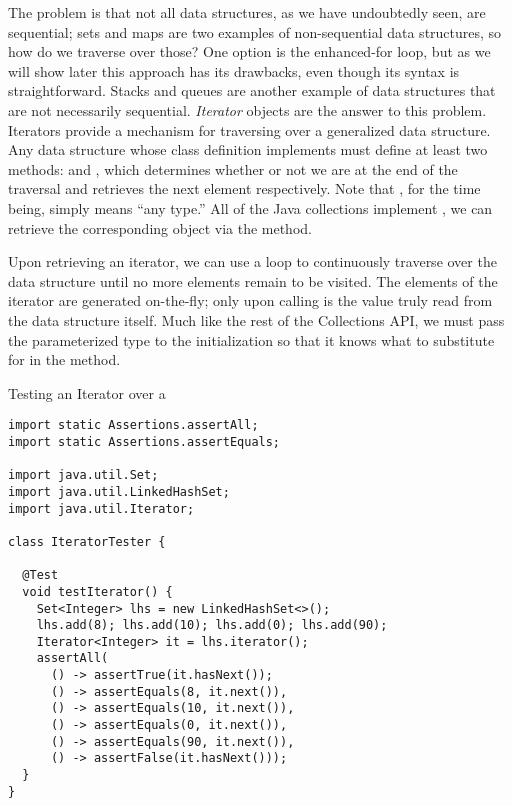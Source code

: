 The problem is that not all data structures, as we have undoubtedly seen, are sequential; sets and maps are two examples of non-sequential data structures, so how do we traverse over those? One option is the enhanced-for loop, but as we will show later this approach has its drawbacks, even though its syntax is straightforward. Stacks and queues are another example of data structures that are not necessarily sequential. \emph{Iterator} objects are the answer to this problem. Iterators provide a mechanism for traversing over a generalized data structure. Any data structure whose class definition implements  must define at least two methods:  and , which determines whether or not we are at the end of the traversal and retrieves the next element respectively. Note that , for the time being, simply means ``any type.'' All of the Java collections implement , we can retrieve the corresponding  object via the  method. 

Upon retrieving an iterator, we can use a  loop to continuously traverse over the data structure until no more elements remain to be visited. The elements of the iterator are generated on-the-fly; only upon calling  is the value truly read from the data structure itself. Much like the rest of the Collections API, we must pass the parameterized type to the  initialization so that it knows what to substitute for  in the  method.


\begin{cl}[]{Testing an Iterator over a }
\begin{lstlisting}[language=MyJava]
import static Assertions.assertAll;
import static Assertions.assertEquals;

import java.util.Set;
import java.util.LinkedHashSet;
import java.util.Iterator;

class IteratorTester {

  @Test
  void testIterator() {
    Set<Integer> lhs = new LinkedHashSet<>();
    lhs.add(8); lhs.add(10); lhs.add(0); lhs.add(90);
    Iterator<Integer> it = lhs.iterator();
    assertAll(
      () -> assertTrue(it.hasNext());
      () -> assertEquals(8, it.next()),
      () -> assertEquals(10, it.next()),
      () -> assertEquals(0, it.next()),
      () -> assertEquals(90, it.next()),
      () -> assertFalse(it.hasNext()));
  }
} 
\end{lstlisting}
\end{cl}

